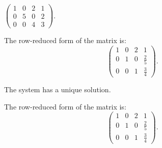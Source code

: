 \documentclass{ximera}
\begin{document}
\begin{exercise} \label{c2.3.11c}
$\left(\begin{array}{ccc|c}  1 & 0 & 2 & 1\\ 0 & 5 & 0 & 2 \\ 0 & 0 & 4 & 3
       \end{array}\right)$.
     \begin{multipleChoice}
     \end{multipleChoice}
     \begin{hint}
       The row-reduced form of the matrix is:
\[
\left(\begin{array}{rrr|r} 1 & 0 & 2 & 1 \\ 0 & 1 & 0 & \frac{2}{5}
\\ 0 & 0 & 1 & \frac{3}{4}\end{array}\right).
\]
     \end{hint}

\begin{solution}

\ans The system has a unique solution.

\soln The row-reduced form of the matrix is:
\[
\left(\begin{array}{rrr|r} 1 & 0 & 2 & 1 \\ 0 & 1 & 0 & \frac{2}{5}
\\ 0 & 0 & 1 & \frac{3}{4}\end{array}\right).
\]

\end{solution}
\end{exercise}
\end{document}
